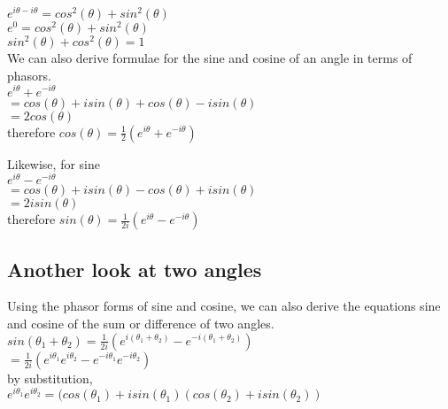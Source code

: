 \tab$e^{i\theta - i\theta} = cos^2(\theta) + sin^2(\theta)$\\

\tab$e^0 = cos^2(\theta) + sin^2(\theta)$\\

\tab$sin^2(\theta) + cos^2(\theta) = 1$\\

We can also derive formulae for the sine and cosine of an angle in terms of phasors.\\

\tab$e^{i\theta} + e^{-i\theta}$\\

\tab$= cos(\theta) + isin(\theta) +  cos(\theta) - isin(\theta)$\\

\tab$= 2cos(\theta)$\\

therefore $cos(\theta) = \frac{1}{2}(e^{i\theta} + e^{-i\theta})$

Likewise, for sine\\

\tab$e^{i\theta} - e^{-i\theta}$\\

\tab$= cos(\theta) + isin(\theta) -  cos(\theta) + isin(\theta)$\\

\tab$= 2isin(\theta)$\\

therefore $sin(\theta) = \frac{1}{2i}(e^{i\theta} - e^{-i\theta})$\\

\subsection{Another look at two angles}

Using the phasor forms of sine and cosine, we can also derive the equations  sine and cosine of the sum or difference of two angles.\\

\tab$sin(\theta_1 + \theta_2) = \frac{1}{2i}(e^{i(\theta_1+\theta_2)} - e^{-i(\theta_1+\theta_2)})$\\

\tab$= \frac{1}{2i}(e^{i\theta_1}e^{i\theta_2} - e^{-i\theta_1}e^{-i\theta_2})$\\

by substitution,\\

\tab$e^{i\theta_1}e^{i\theta_2} = (cos(\theta_1)+isin(\theta_1)(cos(\theta_2) + isin(\theta_2))$\\

